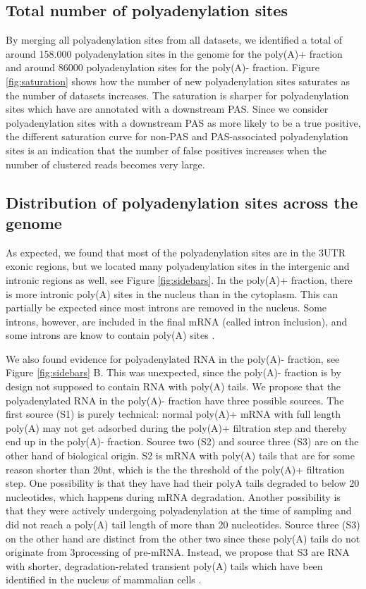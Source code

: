 \subsection{Total number of polyadenylation sites}
By merging all polyadenylation sites from all datasets, we identified a total
of around 158.000 polyadenylation sites in the genome for the poly(A)+ fraction
and around 86000 polyadenylation sites for the poly(A)- fraction. Figure
\ref{fig:saturation} shows how the number of new polyadenylation sites
saturates as the number of datasets increases. The saturation is sharper for
polyadenylation sites which have are annotated with a downstream PAS. Since we
consider polyadenylation sites with a downstream PAS as more likely to be a
true positive, the different saturation curve for non-PAS and PAS-associated
polyadenylation sites is an indication that the number of false positives
increases when the number of clustered reads becomes very large. 

\subsection{Distribution of polyadenylation sites across the genome}
As expected, we found that most of the polyadenylation sites are in the 3\p UTR
exonic regions, but we located many polyadenylation sites in the intergenic
and intronic regions as well, see Figure \ref{fig:sidebars}. In the poly(A)+
fraction, there is more intronic poly(A) sites in the nucleus than in the
cytoplasm. This can partially be expected since most introns are removed in the
nucleus. Some introns, however, are included in the final mRNA (called intron
inclusion), and some introns are know to contain poly(A) sites
\cite{tian_widespread_2007}. 

We also found evidence for polyadenylated RNA in the poly(A)- fraction, see
Figure \ref{fig:sidebars} B. This was unexpected, since the poly(A)- fraction
is by design not supposed to contain RNA with poly(A) tails. We propose that
the polyadenylated RNA in the poly(A)- fraction have three possible sources.
The first source (S1) is purely technical: normal poly(A)+ mRNA with full
length poly(A) may not get adsorbed during the poly(A)+ filtration step and
thereby end up in the poly(A)- fraction. Source two (S2) and source three (S3)
are on the other hand of biological origin. S2 is mRNA with poly(A) tails that
are for some reason shorter than 20nt, which is the the threshold of the
poly(A)+ filtration step. One possibility is that they have had their polyA
tails degraded to below 20 nucleotides, which happens during mRNA degradation.
Another possibility is that they were actively undergoing polyadenylation at
the time of sampling and did not reach a poly(A) tail length of more than 20
nucleotides. Source three (S3) on the other hand are distinct from the other
two since these poly(A) tails do not originate from 3\p processing of pre-mRNA.
Instead, we propose that S3 are RNA with shorter, degradation-related transient
poly(A) tails which have been identified in the nucleus of mammalian cells
\cite{lemay_nuclear_2010}.

